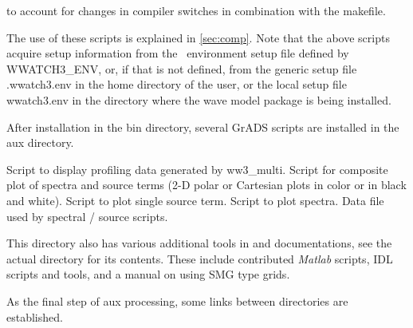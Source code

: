\begin{flist}
{                        to account for changes in compiler switches in
                        combination with the makefile.} 
\end{flist}

\noindent
The use of these scripts is explained in \para\ref{sec:comp}.  Note that the
above scripts acquire setup information from the \ws\ environment setup file
defined by {\code WWATCH3\_ENV}, or, if that is not defined, from the generic 
setup file {\file .wwatch3.env} in the home directory of the user, or the local 
setup file {\file wwatch3.env} in the directory where the wave model package is 
being installed.

\noindent
After installation in the {\dir bin} directory, several GrADS scripts are
installed in the {\dir aux} directory.

\begin{flist}
      {Script to display profiling data generated by {\file
                       ww3\_multi}.} 
       {Script for composite plot of spectra and source
                       terms (2-D polar or Cartesian plots in color or in
                       black and white).}
      {Script to plot single source term.}
         {Script to plot spectra.}
   {Data file used by spectral / source scripts.}
\end{flist}

\noindent
This directory also has various additional tools in and documentations, see
the actual directory for its contents. These include contributed {\it Matlab} scripts,
{\file IDL} scripts and tools, and a manual on using {\file SMG type} grids.

As the final step of {\file aux} processing, some links between directories are established.

